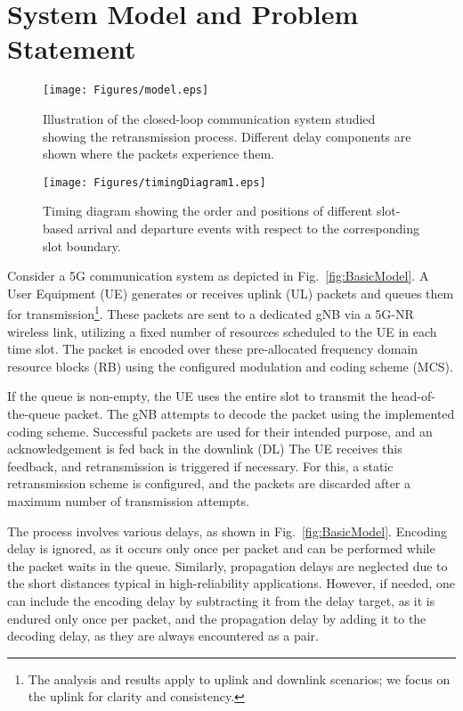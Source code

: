 \section{System Model and Problem Statement}\label{sec:model}
\begin{figure*}[th]
\centering
\begin{minipage}[t]{.5\textwidth}
  \centering
  \texttt{[image: Figures/model.eps]}
  \caption{Illustration of the closed-loop communication system studied showing the retransmission process. Different delay components are shown where the packets experience them.}
  \label{fig:BasicModel}
\end{minipage}%
\hspace{0.03\textwidth}%
\begin{minipage}[t]{0.46\textwidth}
  \centering
  \texttt{[image: Figures/timingDiagram1.eps]}
  \caption{Timing diagram showing the order and positions of different slot-based arrival and departure events with respect to the corresponding slot boundary.}
  \label{fig:timingdiagram}
\end{minipage}
\end{figure*}


Consider a 5G communication system as depicted in Fig.~\ref{fig:BasicModel}. 
A User Equipment (UE) generates or receives uplink (UL) packets and queues them for transmission\footnote{The analysis and results apply to uplink and downlink scenarios; we focus on the uplink for clarity and consistency.}. 
These packets are sent to a dedicated gNB via a 5G-NR wireless link, utilizing a fixed number of resources scheduled to the UE in each time slot.
The packet is encoded over these pre-allocated frequency domain resource blocks (RB) using the configured modulation and coding scheme (MCS).

If the queue is non-empty, the UE uses the entire slot to transmit the head-of-the-queue packet. 
The gNB attempts to decode the packet using the implemented coding scheme. Successful packets are used for their intended purpose, and an acknowledgement is fed back in the downlink (DL)
The UE receives this feedback, and retransmission is triggered if necessary. 
For this, a static retransmission scheme is configured, and the packets are discarded after a maximum number of transmission attempts.

The process involves various delays, as shown in Fig.~\ref{fig:BasicModel}. 
Encoding delay is ignored, as it occurs only once per packet and can be performed while the packet waits in the queue. Similarly, propagation delays are neglected due to the short distances typical in high-reliability applications. 
However, if needed, one can include the encoding delay by subtracting it from the delay target, as it is endured only once per packet, and the propagation delay by adding it to the decoding delay, as they are always encountered as a pair.



